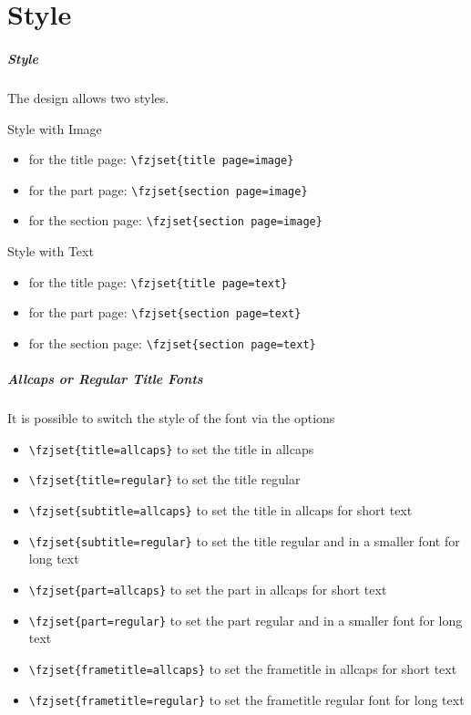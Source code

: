 \documentclass[
t, %
10pt, %
aspectratio=1610, %
ngerman,
english,
]{beamer}
\begin{document}
\part{Style}
\begin{frame}[fragile]
        \frametitle{Style}
        The design allows two styles.
        \begin{block}{Style with Image}
        \begin{itemize}
        \item for the title page: \verb+\fzjset{title page=image}+
        \item for the part page: \verb+\fzjset{section page=image}+
    \item for the section page: \verb+\fzjset{section page=image}+
    \end{itemize}
        \end{block}

        \begin{block}{Style with Text}
    \begin{itemize}
        \item for the title page: \verb+\fzjset{title page=text}+
        \item for the part page: \verb+\fzjset{section page=text}+
    \item for the section page: \verb+\fzjset{section page=text}+
    \end{itemize}
        \end{block}
\end{frame}

\begin{frame}[fragile]
    \frametitle{Allcaps or Regular Title Fonts}
    It is possible to switch the style of the font via the options
    \begin{itemize}
      \item \verb+\fzjset{title=allcaps}+ to set the title in allcaps
      \item \verb+\fzjset{title=regular}+ to set the title regular
      \item \verb+\fzjset{subtitle=allcaps}+ to set the title in allcaps for short text
      \item \verb+\fzjset{subtitle=regular}+ to set the title regular and in a smaller font for long text
      \item \verb+\fzjset{part=allcaps}+ to set the part in allcaps for short text
      \item \verb+\fzjset{part=regular}+ to set the part regular and in a smaller font for long text
      \item \verb+\fzjset{frametitle=allcaps}+ to set the frametitle in allcaps for short text
      \item \verb+\fzjset{frametitle=regular}+ to set the frametitle regular font for long text
    \end{itemize}
\end{frame}
\end{document}
